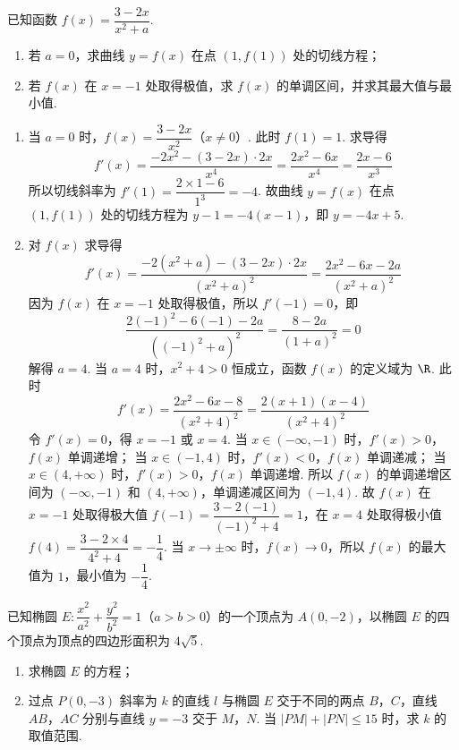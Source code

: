 \begin{problem}
已知函数 \(f(x)=\dfrac{3-2x}{x^2+a}\).

\begin{enumerate}
    \item 若 \(a=0\)，求曲线 \(y=f(x)\) 在点 \((1,f(1))\) 处的切线方程；
    \item 若 \(f(x)\) 在 \(x=-1\) 处取得极值，求 \(f(x)\) 的单调区间，并求其最大值与最小值.
\end{enumerate}
\end{problem}

\begin{solution}
\begin{enumerate}
    \item 当 \(a=0\) 时，\(f(x)=\dfrac{3-2x}{x^2}\)（\(x\ne0\)）. 此时 \(f(1)=1\).
求导得
\[
f'(x)=\frac{-2x^2-(3-2x)\cdot2x}{x^4}=\frac{2x^2-6x}{x^4}=\frac{2x-6}{x^3}
\]
所以切线斜率为 \(f'(1)=\dfrac{2\times 1-6}{1^3}=-4\).
故曲线 \(y=f(x)\) 在点 \((1,f(1))\) 处的切线方程为 \(y-1=-4(x-1)\)，即 \(y=-4x+5\).
    \item 对 \(f(x)\) 求导得
\[
f'(x)=\frac{-2(x^2+a)-(3-2x)\cdot2x}{(x^2+a)^2}=\frac{2x^2-6x-2a}{(x^2+a)^2}
\]
因为 \(f(x)\) 在 \(x=-1\) 处取得极值，所以 \(f'(-1)=0\)，即
\[
\frac{2(-1)^2-6(-1)-2a}{((-1)^2+a)^2}=\frac{8-2a}{(1+a)^2}=0
\]
解得 \(a=4\).
当 \(a=4\) 时，\(x^2+4>0\) 恒成立，函数 \(f(x)\) 的定义域为 \(\R\). 此时
\[
f'(x)=\frac{2x^2-6x-8}{(x^2+4)^2}=\frac{2(x+1)(x-4)}{(x^2+4)^2}
\]
令 \(f'(x)=0\)，得 \(x=-1\) 或 \(x=4\).
当 \(x\in(-\infty,-1)\) 时，\(f'(x)>0\)，\(f(x)\) 单调递增；
当 \(x\in(-1,4)\) 时，\(f'(x)<0\)，\(f(x)\) 单调递减；
当 \(x\in(4,+\infty)\) 时，\(f'(x)>0\)，\(f(x)\) 单调递增.
所以 \(f(x)\) 的单调递增区间为 \((-\infty,-1)\) 和 \((4,+\infty)\)，单调递减区间为 \((-1,4)\).
故 \(f(x)\) 在 \(x=-1\) 处取得极大值 \(f(-1)=\dfrac{3-2(-1)}{(-1)^2+4}=1\)，在 \(x=4\) 处取得极小值 \(f(4)=\dfrac{3-2\times4}{4^2+4}=-\dfrac14\).
当 \(x\to\pm\infty\) 时，\(f(x)\to0\)，所以 \(f(x)\) 的最大值为 \(1\)，最小值为 \(-\dfrac14\).
\end{enumerate}
\end{solution}

\begin{problem}
已知椭圆 \(E:\dfrac{x^2}{a^2}+\dfrac{y^2}{b^2}=1\)（\(a>b>0\)）的一个顶点为 \(A(0,-2)\)，以椭圆 \(E\) 的四个顶点为顶点的四边形面积为 \(4\sqrt5\).

\begin{enumerate}
    \item 求椭圆 \(E\) 的方程；
    \item 过点 \(P(0,-3)\) 斜率为 \(k\) 的直线 \(l\) 与椭圆 \(E\) 交于不同的两点 \(B\)，\(C\)，直线 \(AB\)，\(AC\) 分别与直线 \(y=-3\) 交于 \(M\)，\(N\). 当 \(|PM|+|PN|\le15\) 时，求 \(k\) 的取值范围.
\end{enumerate}
\end{problem}

